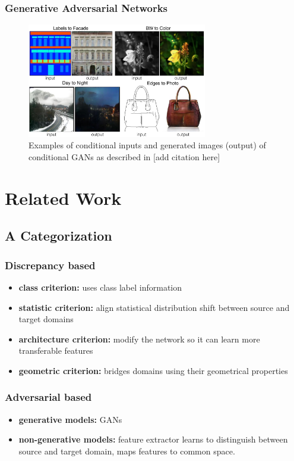 \documentclass{beamer}
\begin{document}
\begin{frame}
\frametitle{Generative Adversarial Networks}
\begin{figure}
	\centering
	\includegraphics[width=0.7\textwidth]{../images/I2I_examples.png}
	\caption{Examples of conditional inputs and generated images (output) of conditional GANs as described in [add citation here]}
\end{figure}
\end{frame}

\section{Related Work}

\subsection{A Categorization}

\begin{frame}
\frametitle{Discrepancy based}
\begin{itemize}
	\item \textbf{class criterion:} uses class label information
	\item \textbf{statistic criterion:} align statistical distribution shift between source and target domains
	\item \textbf{architecture criterion:} modify the  network so it can learn more transferable features
	\item \textbf{geometric criterion:} bridges domains using their geometrical properties
\end{itemize}
\end{frame}

\begin{frame}
\frametitle{Adversarial based}
\begin{itemize}
	\item \textbf{generative models:} GANs
	\item \textbf{non-generative models:} feature extractor learns to distinguish between source and target domain, maps features to common space.
\end{itemize}
\end{frame}
\end{document}
